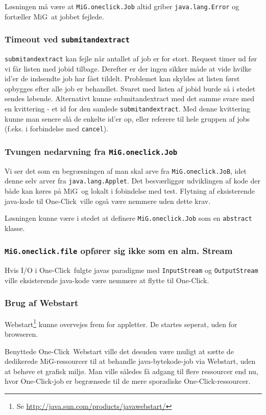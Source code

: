 \documentclass[draft,a4paper,11pt]{article}
\newcommand{\mig}{MiG}
\newcommand{\oc}{One-Click}
\begin{document}
Løsningen må være at \texttt{MiG.oneclick.Job} altid griber \texttt{java.lang.Error} og fortæller \mig\ at jobbet fejlede.

\subsubsection*{Timeout ved \texttt{submitandextract}}
\texttt{submitandextract} kan fejle når antallet af job er for stort. Request timer ud før vi får listen med jobid tilbage. Derefter er der ingen sikker måde at vide hvilke id'er de indsendte job har fået tildelt. 
Problemet kan skyldes at listen først opbygges efter alle job er behandlet. Svaret med listen af jobid burde så i stedet sendes løbende. Alternativt kunne submitandextract med det samme svare med en kvittering - et id for den samlede \texttt{submitandextract}. Med denne kvittering kunne man senere slå de enkelte id'er op, eller referere til hele gruppen af jobs (f.eks. i forbindelse med \texttt{cancel}).

\subsubsection*{Tvungen nedarvning fra \texttt{MiG.oneclick.Job}}
Vi ser det som en begræsningen af man skal arve fra \texttt{MiG.oneclick.JoB}, idet denne selv arver fra \texttt{java.lang.Applet}. Det besværliggør udviklingen af kode der både kan køres på \mig\ og lokalt i fobindelse med test. Flytning af eksisterende java-kode til \oc\ ville også være nemmere uden dette krav.

Løsningen kunne være i stedet at definere \texttt{MiG.oneclick.Job} som en \texttt{abstract} klasse. 

\subsubsection*{\texttt{MiG.oneclick.file} opfører sig ikke som en alm. Stream} 
Hvis I/O i \oc\ fulgte javas paradigme med \texttt{InputStream} og \texttt{OutputStream} ville eksisterende java-kode være nemmere at flytte til \oc.

\subsubsection*{Brug af Webstart}
Webstart\footnote{Se \url{http://java.sun.com/products/javawebstart/}} kunne overvejes frem for appletter. De startes seperat, uden for browseren. 

Benyttede \oc\ Webstart ville det desuden være muligt at sætte de dedikerede \mig-ressourcer til at behandle java-bytekode-job via Webstart, uden at behøve et grafisk miljø. Man ville således få adgang til flere ressourcer end nu, hvor \oc-job er begrænsede til de mere sporadiske \oc-ressourcer.   
\end{document}
